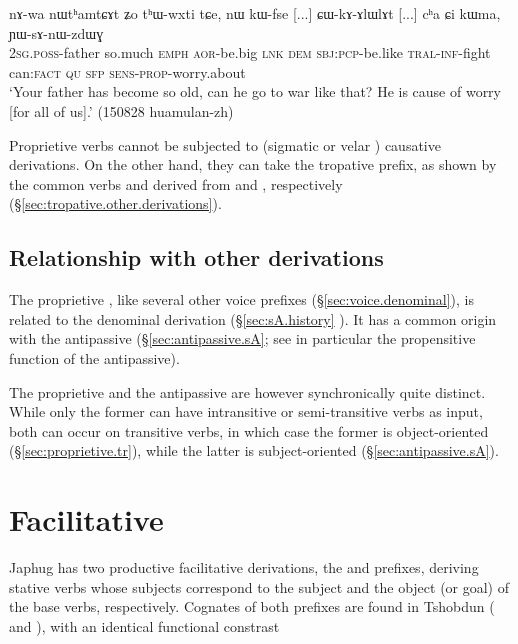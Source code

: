 \begin{exe}
\ex \label{ex:YWsAnWzdWG}
\gll nɤ-wa nɯtʰamtɕɤt ʑo tʰɯ-wxti tɕe, nɯ kɯ-fse [...] ɕɯ-kɤ-ɤlɯlɤt  [...] cʰa ɕi kɯma, ɲɯ-sɤ-nɯ-zdɯɣ\\
\textsc{2sg}.\textsc{poss}-father so.much \textsc{emph} \textsc{aor}-be.big \textsc{lnk} \textsc{dem} \textsc{sbj}:\textsc{pcp}-be.like { } \textsc{tral}-\textsc{inf}-fight { } can:\textsc{fact} \textsc{qu} \textsc{sfp} \textsc{sens}-\textsc{prop}-worry.about\\
\glt `Your father has become so old, can he go to war like that? He is cause of worry [for all of us].' (150828 huamulan-zh) 
\end{exe}

Proprietive verbs cannot be subjected to (sigmatic  or velar ) causative derivations. On the other hand, they can take the tropative  prefix, as shown by the common verbs  and  derived from  and , respectively (§\ref{sec:tropative.other.derivations}).

\subsection{Relationship with other derivations} 
The proprietive , like several other voice prefixes (§\ref{sec:voice.denominal}), is related to the denominal  derivation (§\ref{sec:sA.history} ). It has a common origin with the antipassive  (§\ref{sec:antipassive.sA}; see in particular the propensitive function of the antipassive). 

The proprietive and the  antipassive are however synchronically quite distinct. While only the former can have intransitive or semi-transitive verbs as input, both can occur on transitive verbs, in which case the former is object-oriented (§\ref{sec:proprietive.tr}), while the latter is subject-oriented (§\ref{sec:antipassive.sA}).


\section{Facilitative} \label{sec:facilitative}
Japhug has two productive facilitative derivations, the  and  prefixes, deriving stative verbs whose subjects correspond to the subject and the object (or goal) of the base verbs, respectively. Cognates of both prefixes are found in Tshobdun ( and ), with an identical functional constrast \citep{jackson14morpho}


